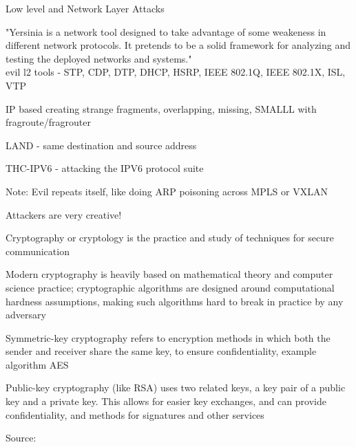 \documentclass[Screen16to9,17pt]{foils}
\begin{document}

\begin{list1}
\item Low level and Network Layer Attacks
\begin{list2}
\item "Yersinia is a network tool designed to take advantage of some weakeness in different network protocols. It pretends to be a solid framework for analyzing and testing the deployed networks and systems."\\
evil l2 tools - STP, CDP, DTP, DHCP, HSRP, IEEE 802.1Q, IEEE 802.1X, ISL, VTP\\
\item IP based creating strange fragments, overlapping, missing, SMALLL with fragroute/fragrouter
\item LAND - same destination and source address
\item THC-IPV6 - attacking the IPV6 protocol suite
\end{list2}
\item Note: Evil repeats itself, like doing ARP poisoning across MPLS or VXLAN
\end{list1}

\vskip 1cm
\centerline{\Large Attackers are very creative!}




\begin{list1}
\item Cryptography or cryptology is the practice and study of techniques for secure communication
\item Modern cryptography is heavily based on mathematical theory and computer science practice; cryptographic algorithms are designed around computational hardness assumptions, making such algorithms hard to break in practice by any adversary
\item Symmetric-key cryptography refers to encryption methods in which both the sender and receiver share the same key, to ensure confidentiality, example algorithm AES
\item Public-key cryptography (like RSA) uses two related keys, a key pair of a public key and a private key. This allows for easier key exchanges, and can provide confidentiality, and methods for signatures and other services
\end{list1}

Source: 
\end{document}
